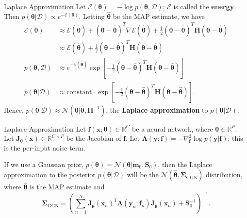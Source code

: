 \documentclass{beamer}
\begin{document}
\begin{frame}{Laplace Approximation}
    Let $\mathcal{E}(\boldsymbol{\theta}) = -\log p(\boldsymbol{\theta}, \mathcal{D})$; $\mathcal{E}$ is called the \textbf{energy}. Then $p(\boldsymbol{\theta} | \mathcal{D}) \propto e^{-\mathcal{E}(\boldsymbol{\theta})}$.
    Letting $\hat{\boldsymbol{\theta}}$ be the MAP estimate, we have
    \begin{align*}
        \mathcal{E}(\boldsymbol{\theta}) &\approx \mathcal{E}(\hat{\boldsymbol{\theta}}) + (\boldsymbol{\theta} - \hat{\boldsymbol{\theta}})^T \nabla\mathcal{E}(\hat{\boldsymbol{\theta}}) + \frac{1}{2}(\boldsymbol{\theta} - \hat{\boldsymbol{\theta}})^T \boldsymbol{H}(\boldsymbol{\theta} - \hat{\boldsymbol{\theta}}) \\
        &\approx \mathcal{E}(\hat{\boldsymbol{\theta}}) + \frac{1}{2}(\boldsymbol{\theta} - \hat{\boldsymbol{\theta}})^T \boldsymbol{H}(\boldsymbol{\theta} - \hat{\boldsymbol{\theta}}) \\
        p(\boldsymbol{\theta}, \mathcal{D}) &\approx e^{-\mathcal{E}(\hat{\boldsymbol{\theta}})}\exp\left[-\frac{1}{2}(\boldsymbol{\theta} - \hat{\boldsymbol{\theta}})^T \boldsymbol{H}(\boldsymbol{\theta} - \hat{\boldsymbol{\theta}})\right] \\
        p(\boldsymbol{\theta} | \mathcal{D}) &\approx \text{constant} \cdot \exp\left[-\frac{1}{2}(\boldsymbol{\theta} - \hat{\boldsymbol{\theta}})^T \boldsymbol{H}(\boldsymbol{\theta} - \hat{\boldsymbol{\theta}})\right].
    \end{align*}
    Hence, $p(\boldsymbol{\theta} | \mathcal{D}) \approx \mathcal{N}(\boldsymbol{\theta} | \hat{\boldsymbol{\theta}}, \boldsymbol{H}^{-1})$, the \textbf{Laplace approximation} to $p(\boldsymbol{\theta} | \mathcal{D})$.
\end{frame}

\begin{frame}{Laplace Approximation}
    Let $\boldsymbol{f}(\boldsymbol{x}; \boldsymbol{\theta}) \in \mathbb{R}^C$ be a neural network, where $\boldsymbol{\theta} \in \mathbb{R}^P$. Let $\boldsymbol{J}_{\boldsymbol{\theta}}(\boldsymbol{x}) \in \mathbb{R}^{C \times P}$ be the Jacobian of $\boldsymbol{f}$. Let $\boldsymbol{\Lambda}(\boldsymbol{y}; \boldsymbol{f}) = -\nabla_{\boldsymbol{f}}^2\log p(\boldsymbol{y} | \boldsymbol{f})$; this is the per-input noise term.
    
    \medskip

    If we use a Gaussian prior, $p(\boldsymbol{\theta}) = \mathcal{N}(\boldsymbol{\theta} | \boldsymbol{m}_0, \boldsymbol{S}_0)$, then the Laplace approximation to the posterior $p(\boldsymbol{\theta} | \mathcal{D})$ will be the $\mathcal{N}(\hat{\boldsymbol{\theta}}, \boldsymbol{\Sigma}_{\text{GGN}})$ distribution, where $\hat{\boldsymbol{\theta}}$ is the MAP estimate and
    \[
    \boldsymbol{\Sigma}_{\text{GGN}} = \left(\sum_{n = 1}^N \boldsymbol{J}_{\hat{\boldsymbol{\theta}}}(\boldsymbol{x}_n)^T\boldsymbol{\Lambda}(\boldsymbol{y}_n; \boldsymbol{f}_n)\boldsymbol{J}_{\hat{\boldsymbol{\theta}}}(\boldsymbol{x}_n) + \boldsymbol{S}_0^{-1}\right)^{-1}.
    \]
\end{frame}
\end{document}
